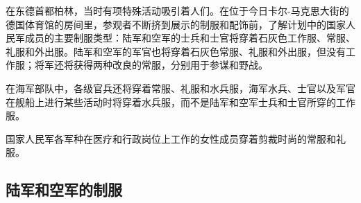在东德首都柏林，当时有项特殊活动吸引着人们。在位于今日卡尔-马克思大街的德国体育馆的房间里，参观者不断挤到展示的制服和配饰前，了解计划中的国家人民军成员的主要制服类型：陆军和空军的士兵和士官将穿着石灰色工作服、常服、礼服和外出服。陆军和空军的军官也将穿着石灰色常服、礼服和外出服，但没有工作服；将军还将获得两种改良的常服，分别用于参谋和野战。

在海军部队中，各级官兵还将穿着常服、礼服和水兵服，海军水兵、士官以及军官在舰船上进行某些活动时将穿着水兵服，而不是陆军和空军士兵和士官所穿的工作服。

国家人民军各军种在医疗和行政岗位上工作的女性成员穿着剪裁时尚的常服和礼服。

\subsection{陆军和空军的制服}

